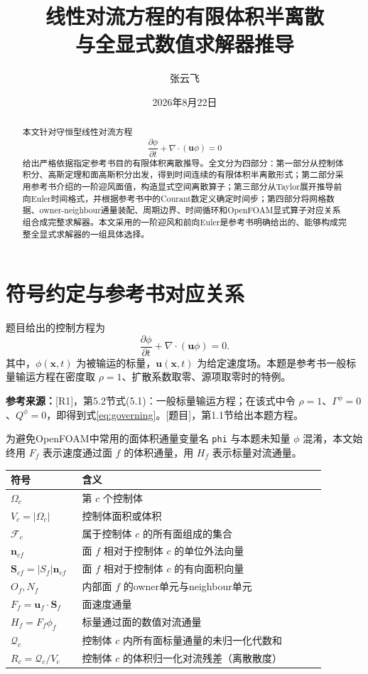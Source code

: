 \documentclass[UTF8,12pt,a4paper]{ctexart}
\title{\bfseries 线性对流方程的有限体积半离散\\与全显式数值求解器推导}
\author{张云飞}
\date{2026年8月22日}
\numberwithin{equation}{section}
\newcommand{\Rone}{\textnormal{[R1]}}
\newcommand{\Task}{\textnormal{[题目]}}
\newcommand{\source}[1]{%
  \par\smallskip
  \noindent\colorbox{sourcebg}{%
    \parbox{0.955\linewidth}{\footnotesize\color{sourcegray}\textbf{参考来源：}#1}%
  }
  \par\smallskip
}
\begin{document}
\maketitle

\begin{abstract}
本文针对守恒型线性对流方程
\[
  \frac{\partial\phi}{\partial t}+\nabla\cdot(\bm u\phi)=0
\]
给出严格依据指定参考书目的有限体积离散推导。全文分为四部分：第一部分从控制体积分、高斯定理和面高斯积分出发，得到时间连续的有限体积半离散形式；第二部分采用参考书介绍的一阶迎风面值，构造显式空间离散算子；第三部分从Taylor展开推导前向Euler时间格式，并根据参考书中的Courant数定义确定时间步；第四部分将网格数据、owner-neighbour通量装配、周期边界、时间循环和OpenFOAM显式算子对应关系组合成完整求解器。本文采用的一阶迎风和前向Euler是参考书明确给出的、能够构成完整全显式求解器的一组具体选择。
\end{abstract}

\tableofcontents
\newpage

\section*{符号约定与参考书对应关系}

题目给出的控制方程为
\begin{equation}
  \frac{\partial\phi}{\partial t}
  +\nabla\cdot(\bm u\phi)=0.
  \label{eq:governing}
\end{equation}
其中，$\phi(\bm x,t)$ 为被输运的标量，$\bm u(\bm x,t)$ 为给定速度场。本题是参考书一般标量输运方程在密度取 $\rho=1$、扩散系数取零、源项取零时的特例。

\source{\Rone，第5.2节式(5.1)：一般标量输运方程；在该式中令 $\rho=1$、$\Gamma^\phi=0$、$Q^\phi=0$，即得到式\eqref{eq:governing}。\Task，第1.1节给出本题方程。}

为避免OpenFOAM中常用的面体积通量变量名 \texttt{phi} 与本题未知量 $\phi$ 混淆，本文始终用 $F_f$ 表示速度通过面 $f$ 的体积通量，用 $H_f$ 表示标量对流通量。

\begin{longtable}{>{\centering\arraybackslash}p{0.18\linewidth}p{0.70\linewidth}}
\toprule
符号 & 含义\\
\midrule
$\Omega_c$ & 第 $c$ 个控制体\\
$V_c=|\Omega_c|$ & 控制体面积或体积\\
$\mathcal F_c$ & 属于控制体 $c$ 的所有面组成的集合\\
$\bm n_{cf}$ & 面 $f$ 相对于控制体 $c$ 的单位外法向量\\
$\bm S_{cf}=|S_f|\bm n_{cf}$ & 面 $f$ 相对于控制体 $c$ 的有向面积向量\\
$O_f,N_f$ & 内部面 $f$ 的owner单元与neighbour单元\\
$F_f=\bm u_f\cdot\bm S_f$ & 面速度通量\\
$H_f=F_f\phi_f$ & 标量通过面的数值对流通量\\
$\mathcal Q_c$ & 控制体 $c$ 内所有面标量通量的未归一化代数和\\
$R_c=\mathcal Q_c/V_c$ & 控制体 $c$ 的体积归一化对流残差（离散散度）\\
\bottomrule
\end{longtable}
\end{document}
